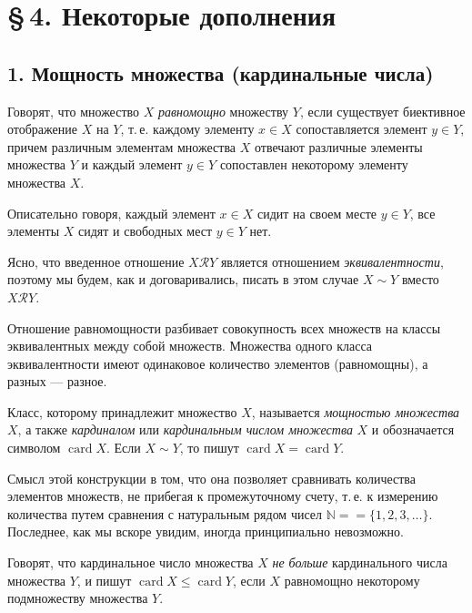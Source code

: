 
\section*{\S\,4. Некоторые дополнения}

\subsection*{1. Мощность множества (кардинальные числа)}

Говорят, что множество $X$ \textit{равномощно} множеству $Y$, если существует
биективное отображение $X$ на $Y$, т.\,е. каждому элементу $x \in X$ сопоставляется
элемент $y \in Y$, причем различным элементам множества $X$ отвечают различные
элементы множества $Y$ и каждый элемент $y \in Y$ сопоставлен некоторому элементу
множества $X$.

Описательно говоря, каждый элемент $x \in X$ сидит на своем месте $y \in Y$,
все элементы $X$ сидят и свободных мест $y \in Y$ нет.

Ясно, что введенное отношение $X \mathscr{R} Y$ является отношением \textit{эквивалентности}, поэтому мы будем, как и договаривались, писать в этом случае $X \sim Y$
вместо $X \mathscr{R} Y$.

Отношение равномощности разбивает совокупность всех множеств на
классы эквивалентных между собой множеств. Множества одного класса
эквивалентности имеют одинаковое количество элементов (равномощны), а
разных --- разное.

Класс, которому принадлежит множество $X$, называется \textit{мощностью множества} $X$, а также \textit{кардиналом} или \textit{кардинальным числом множества} $X$ и
обозначается символом $\operatorname{card} X$. Если $X \sim Y$, то пишут $\operatorname{card} X = \operatorname{card} Y$.

Смысл этой конструкции в том, что она позволяет сравнивать количества элементов множеств, не прибегая к промежуточному счету, т.\,е. к
измерению количества путем сравнения с натуральным рядом чисел $\mathbb{N} =
{} = \{1, 2, 3, \ldots\}$. Последнее, как мы вскоре увидим, иногда принципиально
невозможно.

Говорят, что кардинальное число множества $X$ \textit{не больше} кардинального
числа множества $Y$, и пишут $\operatorname{card} X \leqslant \operatorname{card} Y$, если $X$ равномощно некоторому подмножеству множества $Y$.

